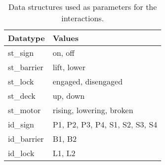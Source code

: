 \begin{table}[htb]%
\begin{tabular}{ll}
	\textbf{Datatype} & \textbf{Values}\\
	\hline
	st\_sign & on, off\\
	st\_barrier & lift, lower\\
	st\_lock & engaged, disengaged\\
	st\_deck & up, down\\
	st\_motor & rising, lowering, broken\\
	\hline
	id\_sign & P1, P2, P3, P4, S1, S2, S3, S4\\
	id\_barrier & B1, B2\\
	id\_lock & L1, L2\\
\end{tabular}
\caption{Data structures used as parameters for the interactions.}
\label{tab:types}
\end{table}
%

\newpage